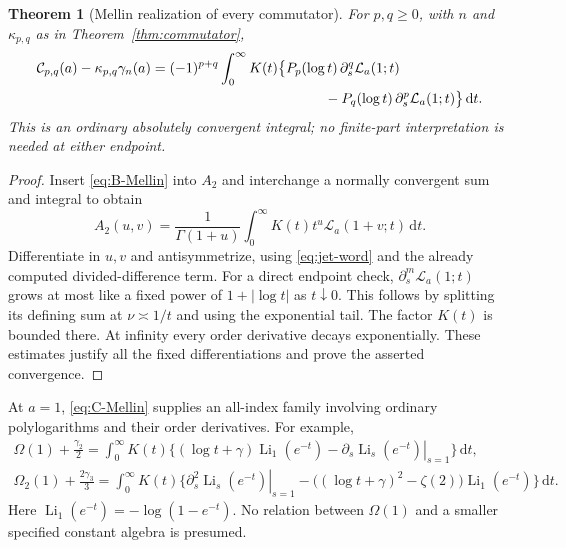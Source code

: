 \documentclass[11pt]{article}
\numberwithin{equation}{section}
\newtheorem{theorem}{Theorem}[section]
\theoremstyle{definition}
\newcommand{\Li}{\operatorname{Li}}
\newcommand{\dd}{\,\mathrm d}
\begin{document}
\begin{theorem}[Mellin realization of every commutator]\label{thm:C-Mellin}
For $p,q\ge0$, with $n$ and $\kappa_{p,q}$ as in
Theorem~\ref{thm:commutator},
\begin{align}\label{eq:C-Mellin}
 \mathcal C_{p,q}(a)-\kappa_{p,q}\gamma_n(a)
 ={}&(-1)^{p+q}\int_0^\infty K(t)
 \bigl\{P_p(\log t)\,\partial_s^q\mathcal L_a(1;t)\notag\\
 &\hspace{39mm}-P_q(\log t)\,\partial_s^p\mathcal L_a(1;t)\bigr\}\dd t.
\end{align}
This is an ordinary absolutely convergent integral; no finite-part
interpretation is needed at either endpoint.
\end{theorem}
\begin{proof}
Insert \eqref{eq:B-Mellin} into $A_2$ and interchange a normally
convergent sum and integral to obtain
\[
 A_2(u,v)=\frac1{\Gamma(1+u)}\int_0^\infty
                       K(t)t^u\mathcal L_a(1+v;t)\dd t.
\]
Differentiate in $u,v$ and antisymmetrize, using
\eqref{eq:jet-word} and the already computed divided-difference term.
For a direct endpoint check, $\partial_s^m\mathcal L_a(1;t)$ grows at
most like a fixed power of $1+|\log t|$ as $t\downarrow0$. This follows
by splitting its defining sum at $\nu\asymp1/t$ and using the exponential
tail. The factor $K(t)$ is bounded there. At infinity every order
derivative decays exponentially. These estimates justify all the fixed
differentiations and prove the asserted convergence.
\end{proof}

At $a=1$, \eqref{eq:C-Mellin} supplies an all-index family involving
ordinary polylogarithms and their order derivatives. For example,
\begin{align}\label{eq:Omega-Mellin}
 \Omega(1)+\frac{\gamma_2}{2}
 =\int_0^\infty K(t)\biggl\{
 (\log t+\gamma)\Li_1(e^{-t})
 -\left.\partial_s\Li_s(e^{-t})\right|_{s=1}\biggr\}\dd t,\\
 \Omega_2(1)+\frac{2\gamma_3}{3}
 =\int_0^\infty K(t)\biggl\{
 \left.\partial_s^2\Li_s(e^{-t})\right|_{s=1}
 -\bigl((\log t+\gamma)^2-\zeta(2)\bigr)\Li_1(e^{-t})
 \biggr\}\dd t.
 \label{eq:Omega2-Mellin}
\end{align}
Here $\Li_1(e^{-t})=-\log(1-e^{-t})$. No relation between
$\Omega(1)$ and a smaller specified constant algebra is presumed.
\end{document}
